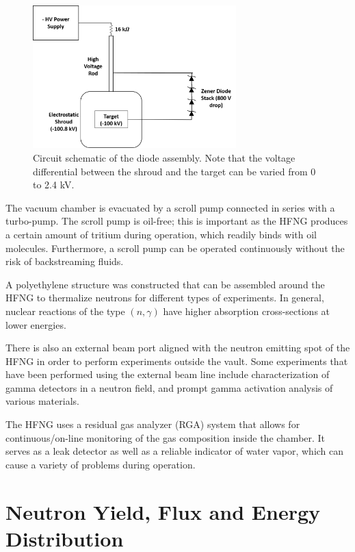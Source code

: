\documentclass[review]{elsarticle}
\begin{document}
\begin{figure}
	\centering
	\includegraphics[width=0.7\textwidth]{pics/diodes3}
	\caption{Circuit schematic of the diode assembly. Note that the voltage differential between the shroud and the target can be varied from 0 to 2.4 kV.}
	\label{fig:diodes}
\end{figure}
	
The vacuum chamber is evacuated by a scroll pump connected in series with a turbo-pump. The scroll pump is oil-free; this is important as the HFNG produces a certain amount of tritium during operation, which readily binds with oil molecules. Furthermore, a scroll pump can be operated continuously without the risk of backstreaming fluids.
	
A polyethylene structure was constructed that can be assembled around the HFNG to thermalize neutrons for different types of experiments. In general, nuclear reactions of the type $(n,\gamma)$ have higher absorption cross-sections at lower energies.

There is also an external beam port aligned with the neutron emitting spot of the HFNG in order to perform experiments outside the vault. Some experiments that have been performed using the external beam line include characterization of gamma detectors in a neutron field, and prompt gamma activation analysis of various materials.   
	
The HFNG uses a residual gas analyzer (RGA) system that allows for continuous/on-line monitoring of the gas composition inside the chamber. It serves as a leak detector as well as a reliable indicator of water vapor, which can cause a variety of problems during operation.
	
	
\section{Neutron Yield, Flux and Energy Distribution}
	
\end{document}
